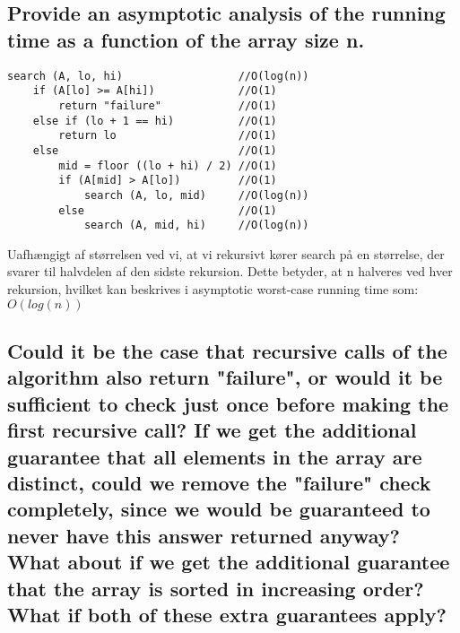 \documentclass[a4paper,12pt]{article}
\begin{document}
    
\subsection[]{Provide an asymptotic analysis of the running time as a function of the array size n.}
    
\begin{lstlisting}
search (A, lo, hi)                  //O(log(n))
    if (A[lo] >= A[hi])             //O(1)
        return "failure"            //O(1)
    else if (lo + 1 == hi)          //O(1)
        return lo                   //O(1)
    else                            //O(1)
        mid = floor ((lo + hi) / 2) //O(1)
        if (A[mid] > A[lo])         //O(1)
            search (A, lo, mid)     //O(log(n))
        else                        //O(1)
            search (A, mid, hi)     //O(log(n))
\end{lstlisting}
Uafhængigt af størrelsen ved vi, at vi rekursivt kører search på en størrelse, der svarer til halvdelen af den sidste rekursion. Dette betyder, at n halveres ved hver rekursion, hvilket kan beskrives i asymptotic worst-case running time som: $O(log(n))$

\subsection[]{Could it be the case that recursive calls of the algorithm also return "failure", or would it
be sufficient to check just once before making the first recursive call? If we get the additional
guarantee that all elements in the array are distinct, could we remove the "failure" check
completely, since we would be guaranteed to never have this answer returned anyway?
What about if we get the additional guarantee that the array is sorted in increasing order?
What if both of these extra guarantees apply?}
\end{document}
